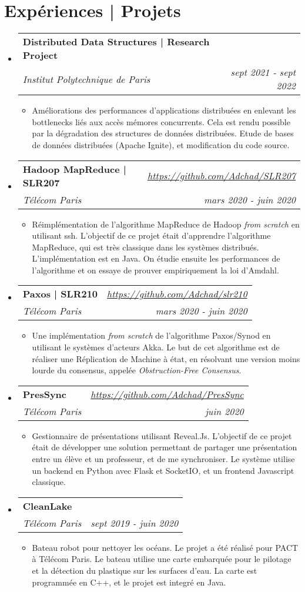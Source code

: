 \documentclass[a4paper,20pt]{article}
\makeatletter
\newcommand{\resumeItemWithoutTitle}[1]{
  \item\small{
    {\vspace{-2pt}#1}
  }
}
\newcommand{\resumeSubheading}[4]{
  \vspace{-1pt}\item
    \begin{tabular*}{0.97\textwidth}{l@{\extracolsep{\fill}}r}
      \textbf{#1} & #2 \\
      \textit{#3} & \textit{#4} \\
    \end{tabular*}\vspace{-5pt}
}
\newcommand{\resumeSubHeadingListStart}{\begin{itemize}[leftmargin=*]}
\newcommand{\resumeSubHeadingListEnd}{\end{itemize}}
\newcommand{\resumeItemListStart}{\begin{itemize}}
\newcommand{\resumeItemListEnd}{\end{itemize}\vspace{-5pt}}
\makeatother
\begin{document}
\section{Expériences | Projets}
 \resumeSubHeadingListStart
  \resumeSubheading
  {Distributed Data Structures | Research Project}{ }
  {Institut Polytechnique de Paris}{sept 2021 - sept 2022}
   \resumeItemListStart 
    \resumeItemWithoutTitle
    {Améliorations des performances d'applications distribuées en enlevant les bottlenecks liés aux accès mémores concurrents. Cela est rendu possible par la dégradation des structures de données distribuées. Etude de bases de données distribuées (Apache Ignite), et modification du code source. }
   \resumeItemListEnd 
  \resumeSubheading
  {Hadoop MapReduce | SLR207}{\textit{\href{https://github.com/Adchad/SLR207}{https://github.com/Adchad/SLR207}}}
  {Télécom Paris}{mars 2020 - juin 2020 }
   \resumeItemListStart 
    \resumeItemWithoutTitle
    {Réimplémentation de l'algorithme MapReduce de Hadoop \textit{from scratch} en utilisant ssh. L'objectif de ce projet était d'apprendre l'algorithme MapReduce, qui est très classique dans les systèmes distribués. L'implémentation est en Java. On étudie ensuite les performances de l'algorithme et on essaye de prouver empiriquement la loi d'Amdahl.}
   \resumeItemListEnd 
  \resumeSubheading
  {Paxos | SLR210}{\textit{\href{https://github.com/Adchad/slr210}{https://github.com/Adchad/slr210}}}
  {Télécom Paris}{mars 2020 - juin 2020 }
   \resumeItemListStart 
    \resumeItemWithoutTitle
    {Une implémentation \textit{from scratch} de l'algorithme Paxos/Synod en utilisant le systèmes d'acteurs Akka. Le but de cet algorithme est de réaliser une Réplication de Machine à état, en résolvant une version moins lourde du consensus, appelée \textit{Obstruction-Free Consensus}.}
   \resumeItemListEnd 
  \resumeSubheading
  {PresSync}{\textit{\href{https://github.com/Adchad/PresSync}{https://github.com/Adchad/PresSync}}}
  {Télécom Paris}{juin 2020}
   \resumeItemListStart 
    \resumeItemWithoutTitle
    {Gestionnaire de présentations utilisant Reveal.Js. L'objectif de ce projet était de développer une solution permettant de partager une présentation entre un élève et un professeur, et de me synchroniser. Le système utilise un backend en Python avec Flask et SocketIO, et un frontend Javascript classique.}
   \resumeItemListEnd 
  \resumeSubheading
  {CleanLake}{ }
  {Télécom Paris}{sept 2019 - juin 2020}
   \resumeItemListStart 
    \resumeItemWithoutTitle
    {Bateau robot pour nettoyer les océans. Le projet a été réalisé pour PACT à Télécom Paris. Le bateau utilise une carte embarquée pour le pilotage et la détection du plastique sur les surfaces d'eau. La carte est programmée en C++, et le projet est integré en Java.}
   \resumeItemListEnd 
 \resumeSubHeadingListEnd
\end{document}
